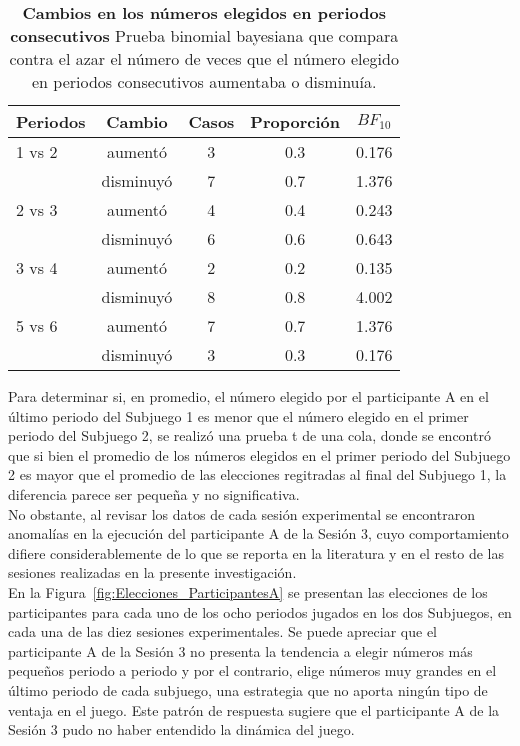 \begin{table}[h]
\caption[Prueba binomial bayesiana para evaluar la proporción de casos en que los participantes A aumentan y reducen su número elegido]{\textbf{Cambios en los números elegidos en periodos consecutivos} Prueba binomial bayesiana que compara contra el azar el número de veces que el número elegido en periodos consecutivos aumentaba o disminuía.}
\label{Binom_Reset}
\centering
\begin{tabular}{l c | c c | c}
\toprule
\textbf{Periodos} & \textbf{Cambio} & \textbf{Casos} & \textbf{Proporción} & \textbf{$BF_{10}$}\\
\midrule
1 vs 2 & aumentó & 3 & 0.3 & 0.176\\
       & disminuyó & 7 & 0.7 & 1.376\\
2 vs 3 & aumentó & 4 & 0.4 & 0.243\\
       & disminuyó & 6 & 0.6 & 0.643\\
3 vs 4 & aumentó & 2 & 0.2 & 0.135\\
       & disminuyó & 8 & 0.8 & 4.002\\
5 vs 6 & aumentó & 7 & 0.7 & 1.376\\
       & disminuyó & 3 & 0.3 & 0.176\\
\bottomrule
\end{tabular}
\end{table}

Para determinar si, en promedio, el número elegido por el participante A en el último periodo del Subjuego 1 es menor que el número elegido en el primer periodo del Subjuego 2, se realizó una prueba t de una cola, donde se encontró que si bien el promedio de los números elegidos en el primer periodo del Subjuego 2 es mayor que el promedio de las elecciones regitradas al final del Subjuego 1, la diferencia parece ser pequeña y no significativa.\\

No obstante, al revisar los datos de cada sesión experimental se encontraron anomalías en la ejecución del participante A de la Sesión 3, cuyo comportamiento difiere considerablemente de lo que se reporta en la literatura y en el resto de las sesiones realizadas en la presente investigación.\\

En la Figura~\ref{fig:Elecciones_ParticipantesA} se presentan las elecciones de los participantes para cada uno de los ocho periodos jugados en los dos Subjuegos, en cada una de las diez sesiones experimentales. Se puede apreciar que el participante A de la Sesión 3 no presenta la tendencia a elegir números más pequeños periodo a periodo y por el contrario, elige números muy grandes en el último periodo de cada subjuego, una estrategia que no aporta ningún tipo de ventaja en el juego. Este patrón de respuesta sugiere que el participante A de la Sesión 3 pudo no haber entendido la dinámica del juego.\\

